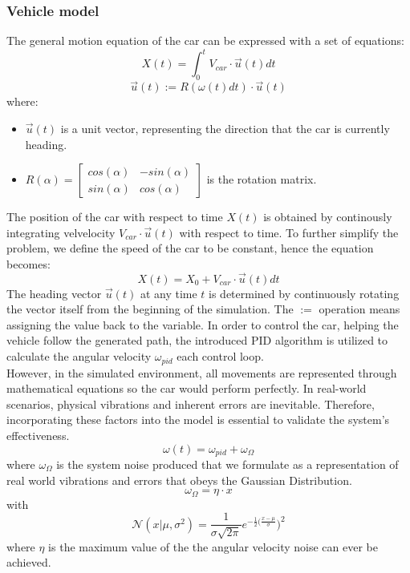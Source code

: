     \subsubsection{Vehicle model}
    The general motion equation of the car can be expressed with a set of equations:
    $$X(t)=\int_0^tV_{car}\cdot\vec{u}(t)dt$$
    $$\vec{u}(t):=R(\omega(t)dt)\cdot\vec{u}(t)$$
    where:
    \begin{itemize}
      \item $\vec{u}(t)$ is a unit vector, representing the direction that the car is currently heading.
      \item $
        R(\alpha)= \begin{bmatrix}
          cos(\alpha) & -sin(\alpha) \\
          sin(\alpha) & cos(\alpha)
        \end{bmatrix}
      $ is the rotation matrix.

    \end{itemize}
    The position of the car with respect to time $X(t)$ is obtained by continously integrating velvelocity $V_{car}\cdot\vec{u}(t)$ with respect to time.
    To further simplify the problem, we define the speed of the car to be constant, hence the equation becomes:
    $$X(t)=X_0+V_{car}\cdot\vec{u}(t)dt$$
    The heading vector $\vec{u}(t)$ at any time $t$ is determined by continuously rotating the vector itself from the beginning of the simulation. The $:=$ operation means assigning the value back to the variable.
    In order to control the car, helping the vehicle follow the generated path, the introduced PID algorithm is utilized to calculate the angular velocity $\omega_{pid}$ each control loop.
    \\
    However, in the simulated environment, all movements are represented through mathematical equations so the car would perform perfectly.
  In real-world scenarios, physical vibrations and inherent errors are inevitable.
  Therefore, incorporating these factors into the model is essential to validate the system's effectiveness.
  $$\omega(t)=\omega_{pid}+\omega_{\Omega}$$
  where $\omega_{\Omega}$ is the system noise produced that we formulate as a representation of real world vibrations and errors that obeys the Gaussian Distribution.
  $$\omega_{\Omega}=\eta\cdot x$$
  with
  $$\mathcal{N}(x|\mu,\sigma^2) = \frac{1}{\sigma\sqrt{2\pi}}e^{-\frac{1}{2}(\frac{x-\mu}{\sigma}})^2 $$
  where $\eta$ is the maximum value of the the angular velocity noise can ever be achieved. 
    
